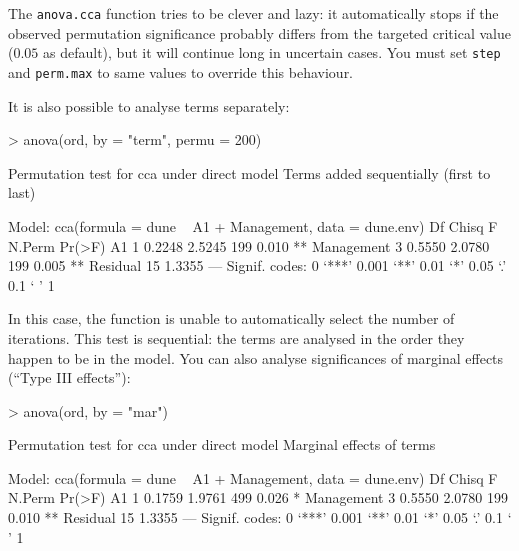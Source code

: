 \documentclass[a4paper,10pt]{amsart}
\begin{document}
The \texttt{anova.cca} function tries to be clever and lazy: it
automatically stops if the observed permutation significance probably
differs from the targeted critical value ($0.05$ as default), but it
will continue long in uncertain cases.  You must set \texttt{step} and
\texttt{perm.max} to same values to override this behaviour.

It is also possible to analyse terms separately:
\begin{Schunk}
\begin{Sinput}
> anova(ord, by = "term", permu = 200)
\end{Sinput}
\begin{Soutput}
Permutation test for cca under direct model
Terms added sequentially (first to last)

Model: cca(formula = dune ~ A1 + Management, data = dune.env)
           Df  Chisq      F N.Perm Pr(>F)   
A1          1 0.2248 2.5245    199  0.010 **
Management  3 0.5550 2.0780    199  0.005 **
Residual   15 1.3355                        
---
Signif. codes:  0 ‘***’ 0.001 ‘**’ 0.01 ‘*’ 0.05 ‘.’ 0.1 ‘ ’ 1 
\end{Soutput}
\end{Schunk}
In this case, the function is unable to automatically select the
number of iterations. This test is sequential: the terms are analysed
in the order they happen to be in the model. You can also analyse
significances of marginal effects (``Type III effects''):
\begin{Schunk}
\begin{Sinput}
> anova(ord, by = "mar")
\end{Sinput}
\begin{Soutput}
Permutation test for cca under direct model
Marginal effects of terms

Model: cca(formula = dune ~ A1 + Management, data = dune.env)
           Df  Chisq      F N.Perm Pr(>F)   
A1          1 0.1759 1.9761    499  0.026 * 
Management  3 0.5550 2.0780    199  0.010 **
Residual   15 1.3355                        
---
Signif. codes:  0 ‘***’ 0.001 ‘**’ 0.01 ‘*’ 0.05 ‘.’ 0.1 ‘ ’ 1 
\end{Soutput}
\end{Schunk}
\end{document}
